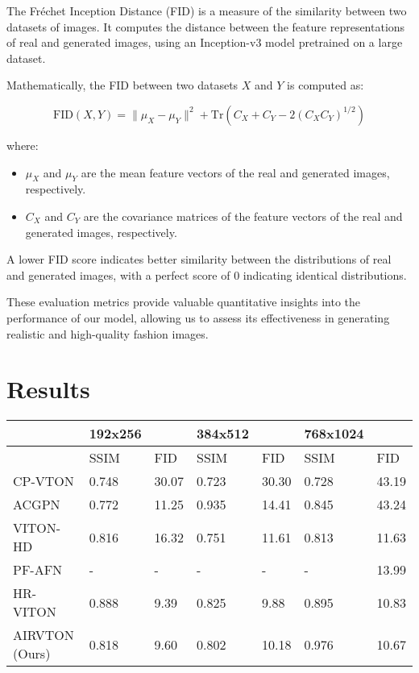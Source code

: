 The Fréchet Inception Distance (FID) is a measure of the similarity between two datasets of images. It computes the distance between the feature representations of real and generated images, using an Inception-v3 model pretrained on a large dataset.

Mathematically, the FID between two datasets \(X\) and \(Y\) is computed as:

\[
\text{FID}(X, Y) = \| \mu_X - \mu_Y \|^2 + \text{Tr}(C_X + C_Y - 2(C_XC_Y)^{1/2})
\]

where:
\begin{itemize}
  \item \(\mu_X\) and \(\mu_Y\) are the mean feature vectors of the real and generated images, respectively.
  \item \(C_X\) and \(C_Y\) are the covariance matrices of the feature vectors of the real and generated images, respectively.
\end{itemize}

A lower FID score indicates better similarity between the distributions of real and generated images, with a perfect score of 0 indicating identical distributions.

These evaluation metrics provide valuable quantitative insights into the performance of our model, allowing us to assess its effectiveness in generating realistic and high-quality fashion images.

\section{Results}

\begin{table}[htbp]
    \centering
    \begin{tabular}[htbp]{|l|l|l|l|l|l|l|}
    \hline
        ~ &  192x256  & ~ & 384x512 & ~ & 768x1024 & ~ \\ \hline
        ~ &  SSIM  &  FID  &  SSIM  &  FID  &  SSIM  &  FID  \\ \hline
        CP-VTON &  0.748  &  30.07  &  0.723  &  30.30  &  0.728  &  43.19  \\ \hline
        ACGPN &  0.772  &  11.25  &  0.935  &  14.41  &  0.845  &  43.24  \\ \hline
        VITON-HD &  0.816  &  16.32  &  0.751  &  11.61  &  0.813  &  11.63  \\ \hline
        PF-AFN &  -    &  -    &  -    &  -    &  -    &  13.99  \\ \hline
        HR-VITON &  0.888  &  9.39  &  0.825  &  9.88  &  0.895  &  10.83  \\ \hline
        AIRVTON (Ours) &  0.818  &  9.60  &  0.802  &  10.18  &  0.976  &  10.67  \\ \hline
    \end{tabular}
\end{table}

